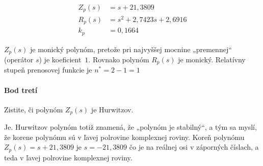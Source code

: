 \documentclass[a4paper, 10pt, ]{article}
\begin{document}
\smallskip



\begin{subequations}
    \begin{align}
        Z_p(s) &= s + 21,3809 \\
        R_p(s) &= s^2 + 2,7423 s + 2,6916 \\
        k_p &= 0,1664
    \end{align}
\end{subequations}



$Z_p(s)$ je monický polynóm, pretože pri najvyššej mocnine „premennej“ (operátor $s$) je koeficient~$1$. Rovnako polynóm $R_p(s)$ je monický. Relatívny stupeň prenosovej funkcie je $n^* = 2 - 1 = 1$










\paragraph{Bod tretí}

\smallskip

{\color{gray}

Zistite, či polynóm $Z_p(s)$ je Hurwitzov.

}

\smallskip


\noindent
Je. Hurwitzov polynóm totiž znamená, že „polynóm je stabilný“, a tým sa myslí, že korene polynómu sú v ľavej polrovine komplexnej roviny. Koreň polynómu $Z_p(s) = s + 21,3809$ je $s = -21,3809$ čo je na reálnej osi v záporných číslach, a teda v ľavej polrovine komplexnej roviny.






















\end{document}
